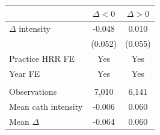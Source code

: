 
\begin{tabular}{lcc}
\toprule
 & $\Delta < 0$ & $\Delta > 0$\\
\midrule
$\Delta$ intensity & -0.048 & 0.010\\
 & (0.052) & (0.055)\\
\addlinespace
Practice HRR FE & Yes & Yes\\
Year FE & Yes & Yes\\
\midrule\\
Observations & 7,010 & 6,141\\
Mean cath intensity & -0.006 & 0.060\\
Mean $\Delta$ & -0.064 & 0.060\\
\bottomrule
\end{tabular}
